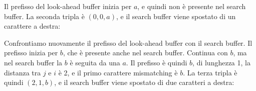 Il prefisso del look-ahead buffer inizia per $a$, e quindi non è presente nel search buffer. La seconda tripla è $(0,0,a)$, e il search buffer viene spostato di un carattere a destra:
\begin{center}
\end{center}
Confrontiamo nuovamente il prefisso del look-ahead buffer con il search buffer. Il prefisso inizia per $b$, che è presente anche nel search buffer. Continua con $b$, ma nel search buffer la $b$ è seguita da una $a$. Il prefisso è quindi $b$, di lunghezza 1, la distanza tra $j$ e $i$ è 2, e il primo carattere mismatching è $b$. La terza tripla è quindi $(2,1,b)$, e il search buffer viene spostato di due caratteri a destra:
